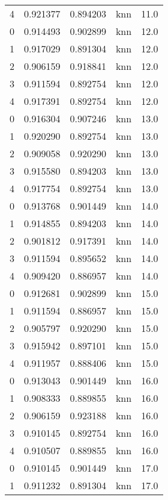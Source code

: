 \begin{tabular}{rrrlr}
     4 & 0.921377 & 0.894203 &      knn &       11.0 \\
     0 & 0.914493 & 0.902899 &      knn &       12.0 \\
     1 & 0.917029 & 0.891304 &      knn &       12.0 \\
     2 & 0.906159 & 0.918841 &      knn &       12.0 \\
     3 & 0.911594 & 0.892754 &      knn &       12.0 \\
     4 & 0.917391 & 0.892754 &      knn &       12.0 \\
     0 & 0.916304 & 0.907246 &      knn &       13.0 \\
     1 & 0.920290 & 0.892754 &      knn &       13.0 \\
     2 & 0.909058 & 0.920290 &      knn &       13.0 \\
     3 & 0.915580 & 0.894203 &      knn &       13.0 \\
     4 & 0.917754 & 0.892754 &      knn &       13.0 \\
     0 & 0.913768 & 0.901449 &      knn &       14.0 \\
     1 & 0.914855 & 0.894203 &      knn &       14.0 \\
     2 & 0.901812 & 0.917391 &      knn &       14.0 \\
     3 & 0.911594 & 0.895652 &      knn &       14.0 \\
     4 & 0.909420 & 0.886957 &      knn &       14.0 \\
     0 & 0.912681 & 0.902899 &      knn &       15.0 \\
     1 & 0.911594 & 0.886957 &      knn &       15.0 \\
     2 & 0.905797 & 0.920290 &      knn &       15.0 \\
     3 & 0.915942 & 0.897101 &      knn &       15.0 \\
     4 & 0.911957 & 0.888406 &      knn &       15.0 \\
     0 & 0.913043 & 0.901449 &      knn &       16.0 \\
     1 & 0.908333 & 0.889855 &      knn &       16.0 \\
     2 & 0.906159 & 0.923188 &      knn &       16.0 \\
     3 & 0.910145 & 0.892754 &      knn &       16.0 \\
     4 & 0.910507 & 0.889855 &      knn &       16.0 \\
     0 & 0.910145 & 0.901449 &      knn &       17.0 \\
     1 & 0.911232 & 0.891304 &      knn &       17.0 \\

\end{tabular}
